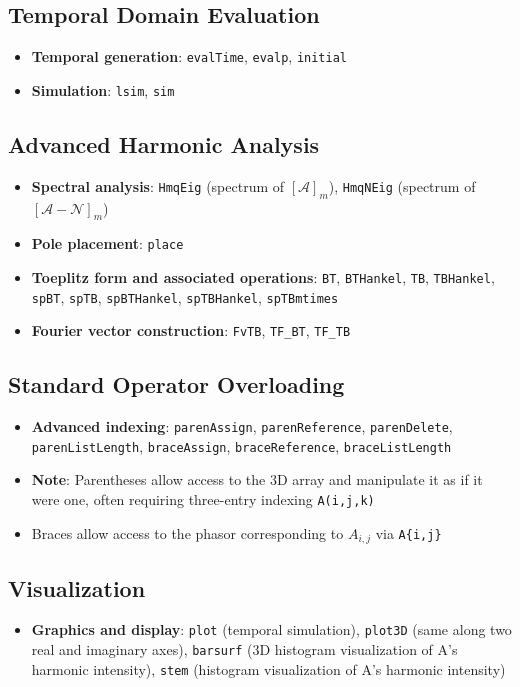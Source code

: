 \documentclass[11pt,a4paper]{article}
\begin{document}
\subsection{Temporal Domain Evaluation}
\begin{itemize}
    \item \textbf{Temporal generation}: \texttt{evalTime}, \texttt{evalp}, \texttt{initial}
    \item \textbf{Simulation}: \texttt{lsim}, \texttt{sim}
\end{itemize}

\subsection{Advanced Harmonic Analysis}
\begin{itemize}
    \item \textbf{Spectral analysis}: \texttt{HmqEig} (spectrum of $[\mathcal{A}]_m$), \texttt{HmqNEig} (spectrum of $[\mathcal{A} - \mathcal{N}]_m$)
    \item \textbf{Pole placement}: \texttt{place}
    \item \textbf{Toeplitz form and associated operations}: \texttt{BT}, \texttt{BTHankel}, \texttt{TB}, \texttt{TBHankel}, \texttt{spBT}, \texttt{spTB}, \texttt{spBTHankel}, \texttt{spTBHankel}, \texttt{spTBmtimes}
    \item \textbf{Fourier vector construction}: \texttt{FvTB}, \texttt{TF\_BT}, \texttt{TF\_TB}
\end{itemize}

\subsection{Standard Operator Overloading}
\begin{itemize}
    \item \textbf{Advanced indexing}: \texttt{parenAssign}, \texttt{parenReference}, \texttt{parenDelete}, \texttt{parenListLength}, \texttt{braceAssign}, \texttt{braceReference}, \texttt{braceListLength}
    \item \textbf{Note}: Parentheses allow access to the 3D array and manipulate it as if it were one, often requiring three-entry indexing \texttt{A(i,j,k)}
    \item Braces allow access to the phasor corresponding to $A_{i,j}$ via \texttt{A\{i,j\}}
\end{itemize}

\subsection{Visualization}
\begin{itemize}
    \item \textbf{Graphics and display}: \texttt{plot} (temporal simulation), \texttt{plot3D} (same along two real and imaginary axes), \texttt{barsurf} (3D histogram visualization of A's harmonic intensity), \texttt{stem} (histogram visualization of A's harmonic intensity)
\end{itemize}
\end{document}
